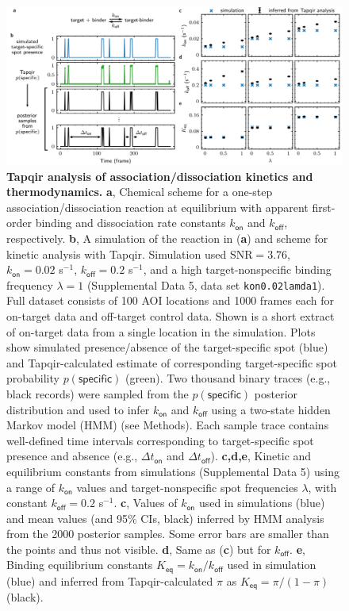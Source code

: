 \begin{figure}
\begin{fullwidth}
\includegraphics[width=183mm]{figures/figure6.png}
\caption{\textbf{Tapqir analysis of association/dissociation kinetics and thermodynamics.} \textbf{a}, Chemical scheme for a one-step association/dissociation reaction at equilibrium with apparent first-order binding and dissociation rate constants $k_{\mathsf{on}}$ and $k_{\mathsf{off}}$, respectively. \textbf{b}, A simulation of the reaction in (\textbf{a}) and scheme for kinetic analysis with Tapqir. Simulation used $\mathrm{SNR} = 3.76$, $k_\mathsf{on} = 0.02$ s$^{-1}$, $k_\mathsf{off} = 0.2$ s$^{-1}$, and a high target-nonspecific binding frequency $\lambda = 1$ (Supplemental Data 5, data set \texttt{kon0.02lamda1}). Full dataset consists of 100 AOI locations and 1000 frames each for on-target data and off-target control data. Shown is a short extract of on-target data from a single location in the simulation.  Plots show simulated presence/absence of the target-specific spot (blue) and Tapqir-calculated estimate of corresponding target-specific spot probability $p(\mathsf{specific})$ (green). Two thousand binary traces (e.g., black records) were sampled from the $p(\mathsf{specific})$ posterior distribution and used to infer $k_\mathsf{on}$ and $k_\mathsf{off}$ using a two-state hidden Markov model (HMM) (see Methods). Each sample trace contains well-defined time intervals corresponding to target-specific spot presence and absence (e.g., $\Delta t_\mathsf{on}$ and $\Delta t_\mathsf{off}$). \textbf{c,d,e}, Kinetic and equilibrium constants from simulations (Supplemental Data 5) using a range of $k_\mathsf{on}$ values and  target-nonspecific spot frequencies $\lambda$, with constant $k_\mathsf{off} = 0.2$ s$^{-1}$. \textbf{c}, Values of $k_{\mathsf{on}}$ used in simulations (blue) and mean values (and 95\% CIs, black) inferred by HMM analysis from the 2000 posterior samples.  Some error bars are smaller than the points and thus not visible. \textbf{d}, Same as (\textbf{c}) but for $k_{\mathsf{off}}$. \textbf{e},  Binding equilibrium constants $K_{\mathsf{eq}} = k_{\mathsf{on}} / k_{\mathsf{off}}$ used in simulation (blue) and inferred from Tapqir-calculated $\pi$ as $K_{\mathsf{eq}} = \pi / (1 - \pi)$ (black). }
\label{fig:kinetic_analysis}
\end{fullwidth}
\end{figure}
